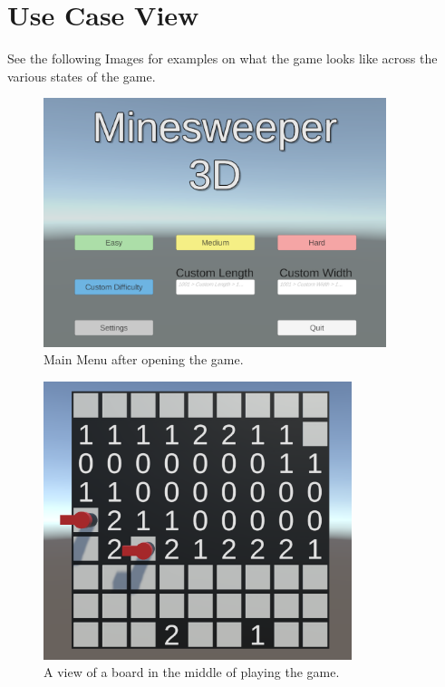 \section{Use Case View}
\label{sec:UCView}

See the following Images for examples on what the game looks like across the various states of the game.

\begin{figure}[!htb]
  \centering
  \includegraphics[width=10cm]{Images/MainMenu.png}
     \caption{Main Menu after opening the game.}
         \label{Fig:MainMenu}
\end{figure}

\begin{figure}[!htb]
    \centering
    \includegraphics[width=9cm]{Images/MidGameBoard.png}
       \caption{A view of a board in the middle of playing the game.}
           \label{Fig:MidGameBoard}
\end{figure}

